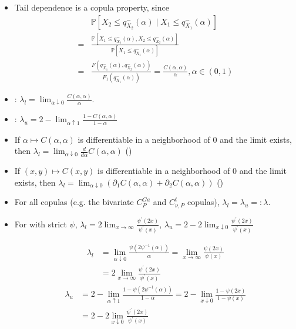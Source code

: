 \begin{itemize}[leftmargin=*]
    \item Tail dependence is a copula property, since
$$
\begin{aligned}
&\mathbb{P}\left[X_{2} \leq q_{X_{2}}^{-}(\alpha) \mid X_{1}  \leq q_{X_{1}}^{-}(\alpha)\right] \\
=&\frac{\mathbb{P}\left[X_{1} \leq q_{X_{1}}^{-}(\alpha), X_{2} \leq q_{X_{2}}^{-}(\alpha)\right]}{\mathbb{P}\left[X_{1} \leq q_{X_{1}}^{-}(\alpha)\right]} \\
=&\frac{F\left(q_{X_{1}}^{-}(\alpha), q_{X_{2}}^{-}(\alpha)\right)}{F_{1}\left(q_{X_{1}}^{-}(\alpha)\right)}=\frac{C(\alpha, \alpha)}{\alpha}, \alpha \in(0,1)
\end{aligned}
$$
    \item {}: $\lambda_{l}=\lim _{\alpha \downarrow 0} \frac{C(\alpha, \alpha)}{\alpha}$.
    \item {}: $\lambda_{u}=2-\lim _{\alpha \uparrow 1} \frac{1-C(\alpha, \alpha)}{1-\alpha}$
    \item If $\alpha \mapsto C(\alpha, \alpha)$ is differentiable in a neighborhood of 0 and the limit exists, then $\lambda_{l}=\lim _{\alpha \downarrow 0} \frac{d}{d \alpha} C(\alpha, \alpha)$ ()
    \item If $(x, y) \mapsto C(x, y)$ is differentiable in a neighborhood of 0 and the limit exists, then $\lambda_{l}=\lim _{\alpha \downarrow 0}\left(\partial_{1} C(\alpha, \alpha)+\partial_{2} C(\alpha, \alpha)\right)$ ()

    \item For all  copulas (e.g. the bivariate $C_{P}^{G a}$ and $C_{\nu, P}^{t}$ copulas), $\lambda_{l}=\lambda_{u}=: \lambda$.
    \item For  with strict $\psi$, $\lambda_{l}=2 \lim _{x \rightarrow \infty} \frac{\psi^{\prime}(2 x)}{\psi^{\prime}(x)}$, $\lambda_{u}=2-2 \lim _{x \downarrow 0} \frac{\psi^{\prime}(2 x)}{\psi^{\prime}(x)}$
    
$$
\begin{aligned}
\lambda_{l}&=\lim _{\alpha \downarrow 0} \frac{\psi\left(2 \psi^{-1}(\alpha)\right)}{\alpha}=\lim _{x \rightarrow \infty} \frac{\psi(2 x)}{\psi(x)} \\
&=2 \lim _{x \rightarrow \infty} \frac{\psi^{\prime}(2 x)}{\psi^{\prime}(x)} 
\end{aligned}
$$
$$
\begin{aligned}
\lambda_{u}&=2-\lim _{\alpha \uparrow 1} \frac{1-\psi\left(2 \psi^{-1}(\alpha)\right)}{1-\alpha}=2-\lim _{x \downarrow 0} \frac{1-\psi(2 x)}{1-\psi(x)} \\
&=2-2 \lim _{x \downarrow 0} \frac{\psi^{\prime}(2 x)}{\psi^{\prime}(x)}
\end{aligned}
$$


\end{itemize}
